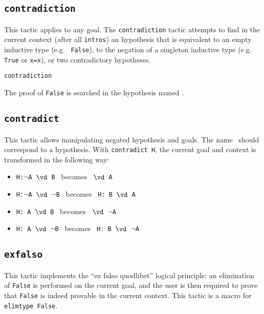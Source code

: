 \begin{coq_example*}
\subsection{\tt contradiction}
\label{contradiction}

This tactic applies to any goal. The {\tt contradiction} tactic
attempts to find in the current context (after all {\tt intros}) an
hypothesis that is equivalent to an empty inductive type (e.g. {\tt
  False}), to the negation of a singleton inductive type (e.g. {\tt
  True} or {\tt x=x}), or two contradictory hypotheses.

\begin{ErrMsgs}
\item {}
\end{ErrMsgs}

\begin{Variants}
\item {\tt contradiction \ident}

The proof of {\tt False} is searched in the hypothesis named \ident.
\end{Variants}

\subsection{\tt contradict \ident}
\label{contradict}

This tactic allows manipulating negated hypothesis and goals. The
name \ident\ should correspond to a hypothesis. With
{\tt contradict H}, the current goal and context is transformed in
the following way:
\begin{itemize}
\item  {\tt H:$\neg$A $\vd$  B} \ becomes \ {\tt $\vd$ A}
\item  {\tt H:$\neg$A $\vd$ $\neg$B} \  becomes \ {\tt H: B $\vd$  A }
\item  {\tt H: A $\vd$  B} \ becomes \ {\tt $\vd$ $\neg$A}
\item  {\tt H: A $\vd$ $\neg$B} \ becomes \ {\tt H: B $\vd$ $\neg$A}
\end{itemize}

\subsection{\tt exfalso}
\label{exfalso}

This tactic implements the ``ex falso quodlibet'' logical principle:
an elimination of {\tt False} is performed on the current goal, and the
user is then required to prove that {\tt False} is indeed provable in
the current context. This tactic is a macro for {\tt elimtype False}.


\end{coq_example*}
